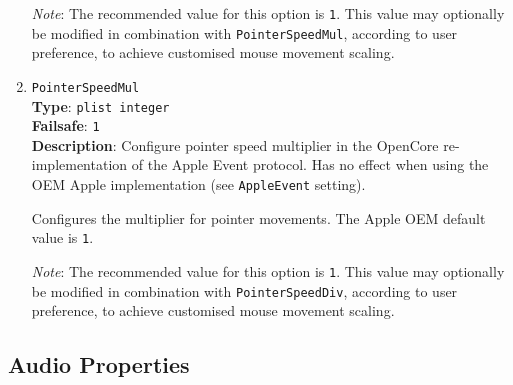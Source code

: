 \documentclass[]{article}
\begin{document}
\begin{enumerate}
  \emph{Note}: The recommended value for this option is \texttt{1}. This value may
  optionally be modified in combination with \texttt{PointerSpeedMul}, according to user
  preference, to achieve customised mouse movement scaling.

\item
  \texttt{PointerSpeedMul}\\
  \textbf{Type}: \texttt{plist\ integer}\\
  \textbf{Failsafe}: \texttt{1}\\
  \textbf{Description}: Configure pointer speed multiplier in the OpenCore re-implementation
  of the Apple Event protocol.
  Has no effect when using the OEM Apple implementation (see \texttt{AppleEvent} setting).

  Configures the multiplier for pointer movements. The Apple OEM default value is \texttt{1}.

  \emph{Note}: The recommended value for this option is \texttt{1}. This value may
  optionally be modified in combination with \texttt{PointerSpeedDiv}, according to user
  preference, to achieve customised mouse movement scaling.

\end{enumerate}

\subsection{Audio Properties}\label{uefiaudioprops}
\end{document}
